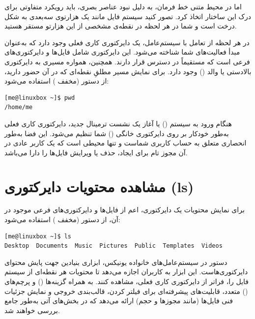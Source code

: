 اما در محیط متنی خط فرمان، به دلیل نبود عناصر بصری، باید رویکرد متفاوتی برای درک این ساختار اتخاذ کرد. تصور کنید سیستم فایل مانند یک هزارتوی سه‌بعدی به شکل درخت است و شما در هر لحظه در نقطه‌ی مشخصی از این هزارتو مستقر هستید.


در هر لحظه از تعامل با سیستم‌عامل، یک دایرکتوری کاری فعلی وجود دارد که به‌عنوان مبدأ فعالیت‌های شما شناخته می‌شود. این دایرکتوری شامل فایل‌ها و دایرکتوری‌های فرعی است که مستقیماً در دسترس قرار دارند. همچنین، همواره مسیری به دایرکتوری بالادستی یا والد () وجود دارد. برای نمایش مسیر مطلقِ نقطه‌ای که در آن حضور دارید، از دستور  (مخفف ) استفاده می‌شود:

\begin{latin}
\begin{lstlisting}
[me@linuxbox ~]$ pwd
/home/me
\end{lstlisting}
\end{latin}

هنگام ورود به سیستم () یا آغاز یک نشست ترمینال جدید، دایرکتوری کاری فعلی به‌طور خودکار بر روی دایرکتوری خانگی () شما تنظیم می‌شود. این فضا به‌طور انحصاری متعلق به حساب کاربری شماست و تنها محیطی است که یک کاربر عادی در آن مجوز تام برای ایجاد، حذف یا ویرایش فایل‌ها را دارا می‌باشد.

\section{مشاهده محتویات دایرکتوری (ls)}

برای نمایش محتویات یک دایرکتوری، اعم از فایل‌ها و دایرکتوری‌های فرعی موجود در آن، از دستور  (مخفف ) استفاده می‌شود:

\begin{latin}
\begin{lstlisting}
[me@linuxbox ~]$ ls
Desktop  Documents  Music  Pictures  Public  Templates  Videos
\end{lstlisting}
\end{latin}

دستور  در سیستم‌عامل‌های خانواده یونیکس، ابزاری بنیادین جهت پایش محتوای دایرکتوری‌هاست. این ابزار به کاربران اجازه می‌دهد تا محتویات هر نقطه‌ای از سیستم فایل را، فراتر از دایرکتوری کاری فعلی، مشاهده کنند.  به همراه گزینه‌ها () و پرچم‌های () متعدد، قابلیت‌های پیشرفته‌ای برای فیلتر کردن، قالب‌بندی خروجی و نمایش جزئیات فنی فایل‌ها (مانند مجوزها و حجم) ارائه می‌دهد که در بخش‌های آتی به‌طور جامع بررسی خواهند شد.

